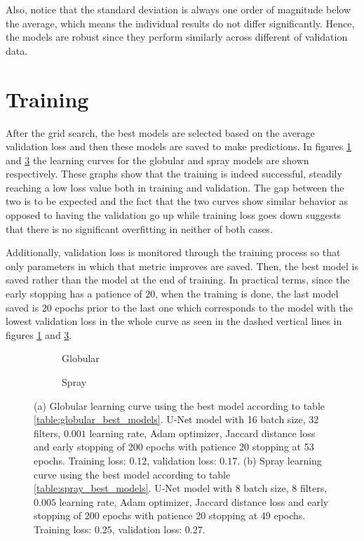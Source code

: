 Also, notice that the standard deviation is always one order of magnitude below the average, which means the individual results do not differ significantly. Hence, the models are robust since they perform similarly across different of validation data.



\section{Training}

After the grid search, the best models are selected based on the average validation loss and then these models are saved to make predictions. In figures \ref{fig:globular_loss_curve} and \ref{fig:spray_loss_curve} the learning curves for the globular and spray models are shown respectively. These graphs show that the training is indeed successful, steadily reaching a low loss value both in training and validation. The gap between the two is to be expected and the fact that the two curves show similar behavior as opposed to having the validation go up while training loss goes down suggests that there is no significant overfitting in neither of both cases.

Additionally, validation loss is monitored through the training process so that only parameters in which that metric improves are saved. Then, the best model is saved rather than the model at the end of training. In practical terms, since the early stopping has a patience of 20, when the training is done, the last model saved is 20 epochs prior to the last one which corresponds to the model with the lowest validation loss in the whole curve as seen in the dashed vertical lines in figures \ref{fig:globular_loss_curve} and \ref{fig:spray_loss_curve}.

\begin{figure}
  \begin{subfigure}[b]{\textwidth}
    
    \caption[Globular learning curve]{Globular}
    \label{fig:globular_loss_curve}
  \end{subfigure}
\vfill
  \begin{subfigure}[b]{\textwidth}
    
    \caption[Spray learning curve]{Spray}
    \label{fig:spray_loss_curve}
  \end{subfigure}
  \caption[]{(a) Globular learning curve using the best model according to table \ref{table:globular_best_models}. U-Net model with 16 batch size, 32 filters, $0.001$ learning rate, Adam optimizer, Jaccard distance loss and early stopping of 200 epochs with patience 20 stopping at 53 epochs. Training loss: $0.12$, validation loss: $0.17$. (b) Spray learning curve using the best model according to table \ref{table:spray_best_models}. U-Net model with 8 batch size, 8 filters, $0.005$ learning rate, Adam optimizer, Jaccard distance loss and early stopping of 200 epochs with patience 20 stopping at 49 epochs. Training loss: $0.25$, validation loss: $0.27$.} 
\end{figure}

